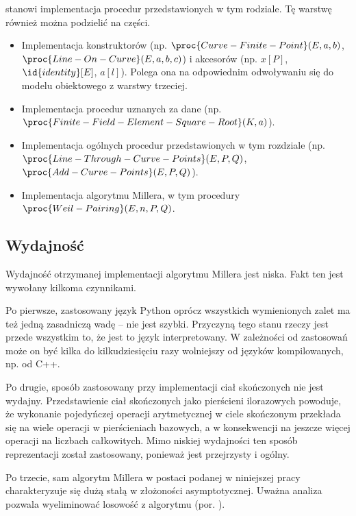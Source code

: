\begin{enumerate}
stanowi implementacja procedur przedstawionych w tym rodziale.
Tę warstwę również można podzielić na części.
\begin{itemize}
\item
Implementacja konstruktorów
(np. $\proc{Curve-Finite-Point}(E, a, b)$, $\proc{Line-On-Curve}(E, a, b, c)$)
i akcesorów (np. $x[P]$, $\id{identity}[E]$, $a[l]$).
Polega ona na odpowiednim odwoływaniu się
do modelu obiektowego z warstwy trzeciej.
\item
Implementacja procedur uznanych za dane
(np. $\proc{Finite-Field-Element-Square-Root}(K, a)$).
\item
Implementacja ogólnych procedur przedstawionych w tym rozdziale
(np. $\proc{Line-Through-Curve-Points}(E, P, Q)$,
$\proc{Add-Curve-Points}(E, P, Q)$).
\item
Implementacja algorytmu Millera,
w tym procedury $\proc{Weil-Pairing}(E, n, P, Q)$.
\end{itemize}
\end{enumerate}

\subsection*{Wydajność}

\noindent
Wydajność otrzymanej implementacji algorytmu Millera jest niska.
Fakt ten jest wywołany kilkoma czynnikami.

\noindent
Po pierwsze, zastosowany język Python oprócz wszystkich wymienionych zalet
ma też jedną zasadniczą wadę -- nie jest szybki.
Przyczyną tego stanu rzeczy jest przede wszystkim to,
że jest to język interpretowany.
W zależności od zastosowań może on być kilka do kilkudziesięciu razy
wolniejszy od języków kompilowanych, np. od C++.

\noindent
Po drugie, sposób zastosowany przy implementacji ciał skończonych
nie jest wydajny.
Przedstawienie ciał skończonych jako pierścieni ilorazowych powoduje,
że wykonanie pojedyńczej operacji arytmetycznej w ciele skończonym
przekłada się na wiele operacji w pierścieniach bazowych,
a w konsekwencji na jeszcze więcej operacji na liczbach całkowitych.
Mimo niskiej wydajności ten sposób reprezentacji został zastosowany,
ponieważ jest przejrzysty i ogólny.

\noindent
Po trzecie, sam algorytm Millera w postaci podanej w niniejszej pracy
charakteryzuje się dużą stałą w złożoności asymptotycznej.
Uważna analiza pozwala wyeliminować losowość z algorytmu (por. \cite{miller}).

